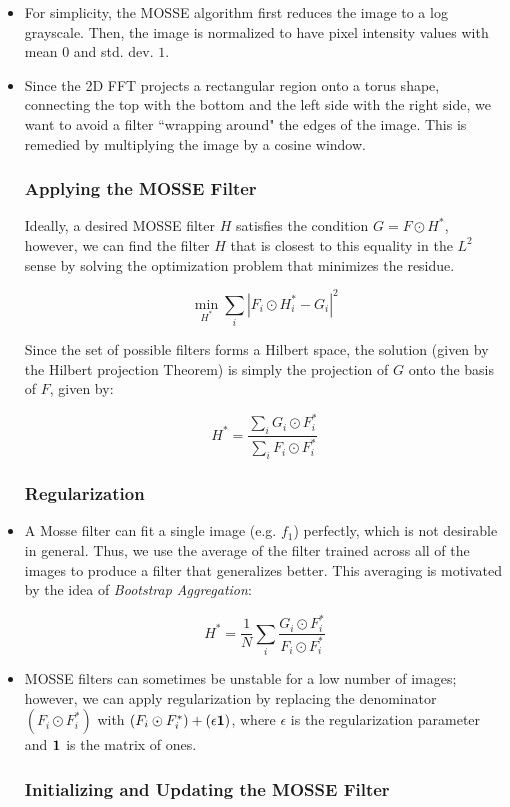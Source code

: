 \documentclass[12pt]{article}
\newcommand{\bv}[1]{\ensuremath\mathbf{#1}}
\begin{document}
\begin{itemize}
\item For simplicity, the MOSSE algorithm first reduces the image to a log grayscale. Then, the image is normalized to have pixel intensity values with mean $0$ and std. dev. $1$.

\item Since the 2D FFT projects a rectangular region onto a torus shape, connecting the top with the bottom and the left side with the right side, we want to avoid a filter ``wrapping around" the edges of the image. This is remedied by multiplying the image by a cosine window.

\subsubsection*{Applying the MOSSE Filter}

Ideally, a desired MOSSE filter $H$ satisfies the condition $G = F \odot H^*$, however, we can find the filter $H$ that is closest to this equality in the $L^2$ sense by solving the optimization problem that minimizes the residue.

$$\min_{H^*}\sum_{i}|F_i \odot H_i^* - G_i|^2$$

Since the set of possible filters forms a Hilbert space, the solution (given by the Hilbert projection Theorem) is simply the projection of $G$ onto the basis of $F$, given by:

$$H^* = \frac{\sum_{i} G_i \odot F_i^*}{\sum_{i} F_i \odot F_i^*}$$

\subsubsection*{Regularization}

\item A Mosse filter can fit a single image (e.g. $f_1$) perfectly, which is not desirable in general. Thus, we use the average of the filter trained across all of the images to produce a filter that generalizes better. This averaging is motivated by the idea of \textit{Bootstrap Aggregation}:

$$H^* = \frac{1}{N}\sum_{i} \frac{G_i \odot F_i^*}{F_i \odot F_i^*}$$

\item MOSSE filters can sometimes be unstable for a low number of images; however, we can apply regularization by replacing the denominator $(F_i \odot F_i^*)$ with $(F_i \odot F_i^*) + (\epsilon\bv{1})$, where $\epsilon$ is the regularization parameter and $\bv{1}$ is the matrix of ones.



\subsubsection*{Initializing and Updating the MOSSE Filter}


\end{itemize}
\end{document}
